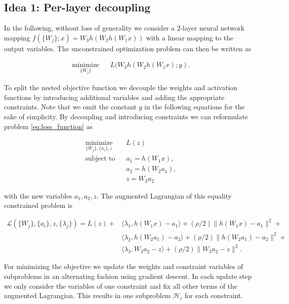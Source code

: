 \documentclass[english,11pt,a4paper]{article}
\newcommand\inner[2]{\langle #1, #2 \rangle}
\begin{document}
\subsection{Idea 1: Per-layer decoupling}

In the following, without loss of generality we consider a 2-layer neural network mapping $f(\{W_j\};x) = W_3h(W_2h(W_1x))$ with a linear mapping to the output variables. The unconstrained optimization problem can then be written as

\begin{equation}
	\begin{aligned}
		& \underset{\{W_j\}}{\text{minimize}}
		& & L(W_3h(W_2h(W_1x);y).
	\end{aligned}
	\label{eq:loss_function}
\end{equation}

To split the nested objective function we decouple the weights and activation functions by introducing additional variables and adding the appropriate constraints. Note that we omit the constant $y$ in the following equations for the sake of simplicity. By decoupling and introducing constraints we can reformulate problem \ref{eq:loss_function} as

\begin{equation}
	\begin{aligned}
		& \underset{\{W_j\},\{a_i\},z}{\text{minimize}}
		&& L(z) \\
		& \text{subject to}
		&&  a_1 = h(W_1x), \\
		&&& a_2 = h(W_2a_1), \\
		&&& z = W_3a_2
	\end{aligned}
\end{equation}

with the new variables $a_1, a_2, z$. The augmented Lagrangian of this equality constrained problem is

\begin{equation}
	\begin{aligned}
		\mathcal{L}(\{W_j\}, \{a_i\}, z, \{\lambda_j\}) = L(z) + 
		& \inner{\lambda_1}{h(W_1x)-a_1} + (\rho/2) \| h(W_1x)-a_1 \|^2 + \\
		& \inner{\lambda_2}{h(W_2a_1)-a_2} + (\rho/2) \| h(W_2a_1)-a_2 \|^2 + \\
		& \inner{\lambda_3}{W_3a_2-z} + (\rho/2) \| W_3a_2-z \|^2.
	\end{aligned}
\end{equation}

For minimizing the objective we update the weights and constraint variables of subproblems in an alternating fashion using gradient descent. In each update step we only consider the variables of one constraint and fix all other terms of the augmented Lagrangian. This results in one subproblem $\mathcal{H}_i$ for each constraint.
\end{document}
